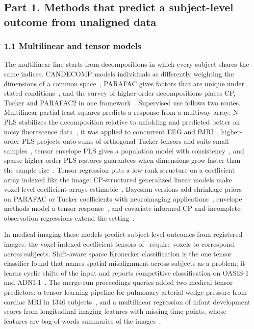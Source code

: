 \documentclass[journal,onecolumn]{IEEEtran}
\begin{document}
\subsection{Part 1. Methods that predict a subject-level outcome from unaligned data}

\subsubsection{1.1 Multilinear and tensor models}

The multilinear line starts from decompositions in which every subject shares the same indices. CANDECOMP models individuals as differently weighting the dimensions of a common space~\cite{Carroll1970Individual}, PARAFAC gives factors that are unique under stated conditions~\cite{Harshman1970Foundations}, and the survey of higher-order decompositions places CP, Tucker and PARAFAC2 in one framework~\cite{Kolda2009Tensor}. Supervised use follows two routes. Multilinear partial least squares predicts a response from a multiway array: N-PLS stabilizes the decomposition relative to unfolding and predicted better on noisy fluorescence data~\cite{Bro1996Multiway}, it was applied to concurrent EEG and fMRI~\cite{MartinezMontes2004Concurrent}, higher-order PLS projects onto sums of orthogonal Tucker tensors and suits small samples~\cite{Zhao2013HOPLS}, tensor envelope PLS gives a population model with consistency~\cite{Zhang2017Envelope}, and sparse higher-order PLS restores guarantees when dimensions grow faster than the sample size~\cite{Park2026Sparse}. Tensor regression puts a low-rank structure on a coefficient array indexed like the image: CP-structured generalized linear models make voxel-level coefficient arrays estimable~\cite{Zhou2013Tensor}, Bayesian versions add shrinkage priors on PARAFAC or Tucker coefficients with neuroimaging applications~\cite{Guhaniyogi2017Bayesian,Spencer2024Bayesian}, envelope methods model a tensor response~\cite{Li2017Parsimonious}, and covariate-informed CP and incomplete-observation regressions extend the setting~\cite{Lock2018Supervised,Xu2024Incomplete}.

In medical imaging these models predict subject-level outcomes from registered images: the voxel-indexed coefficient tensors of~\cite{Zhou2013Tensor,Guhaniyogi2017Bayesian,Li2017Parsimonious,Zhang2017Envelope,Spencer2024Bayesian} require voxels to correspond across subjects. Shift-aware sparse Kronecker classification is the one tensor classifier found that names spatial misalignment across subjects as a problem; it learns cyclic shifts of the input and reports competitive classification on OASIS-1 and ADNI-1~\cite{Huang2026ShiftAware}. The merge-run proceedings queries added two medical tensor predictors: a tensor learning pipeline for pulmonary arterial wedge pressure from cardiac MRI in 1346 subjects~\cite{Tripathi2023Tensor}, and a multilinear regression of infant development scores from longitudinal imaging features with missing time points, whose features are bag-of-words summaries of the images~\cite{Adeli2017Joint}.
\end{document}
